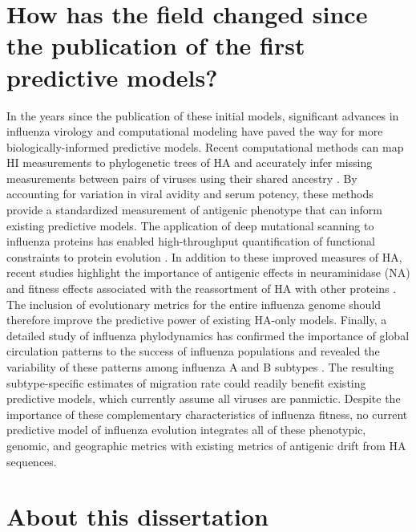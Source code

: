 \section{How has the field changed since the publication of the first predictive models?}

In the years since the publication of these initial models, significant advances in influenza virology and computational modeling have paved the way for more biologically-informed predictive models.
Recent computational methods can map HI measurements to phylogenetic trees of HA and accurately infer missing measurements between pairs of viruses using their shared ancestry \citep{Neher:2016hy}.
By accounting for variation in viral avidity and serum potency, these methods provide a standardized measurement of antigenic phenotype that can inform existing predictive models.
The application of deep mutational scanning to influenza proteins has enabled high-throughput quantification of functional constraints to protein evolution \citep{Thyagarajan:2014go,Wu:2014ii,Doud:2016gm}.
In addition to these improved measures of HA, recent studies highlight the importance of antigenic effects in neuraminidase (NA) \citep{Chen:2018kp} and fitness effects associated with the reassortment of HA with other proteins \citep{Villa:2017iw}.
The inclusion of evolutionary metrics for the entire influenza genome should therefore improve the predictive power of existing HA-only models.
Finally, a detailed study of influenza phylodynamics has confirmed the importance of global circulation patterns to the success of influenza populations and revealed the variability of these patterns among influenza A and B subtypes \citep{Bedford:2015fj}.
The resulting subtype-specific estimates of migration rate could readily benefit existing predictive models, which currently assume all viruses are panmictic.
Despite the importance of these complementary characteristics of influenza fitness, no current predictive model of influenza evolution integrates all of these phenotypic, genomic, and geographic metrics with existing metrics of antigenic drift from HA sequences.

\section{About this dissertation}

